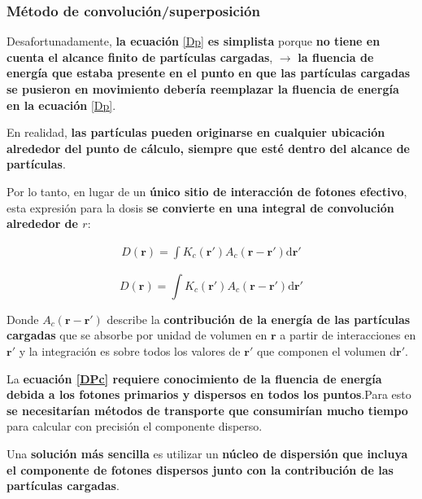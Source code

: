 \documentclass[aspectratio=169,xcolor=dvipsnames,t]{beamer}
\newcommand{\be}{\begin{equation*}}
\newcommand{\ee}{\end{equation*}}
\newcommand{\bae}{\begin{eqnarray}}
\newcommand{\eae}{\end{eqnarray}}
\begin{document}
\begin{frame}

    \frametitle{Método de convolución/superposición}

    Desafortunadamente, \textbf{la ecuación} \eqref{Dp} \textbf{es simplista} porque \textbf{no tiene en cuenta el alcance finito de partículas cargadas}, $\rightarrow$ \textbf{la fluencia de energía que estaba presente en el punto en que las partículas cargadas se pusieron en movimiento debería reemplazar la fluencia de energía en la ecuación} \eqref{Dp}.

    En realidad, \textbf{las partículas pueden originarse en cualquier ubicación alrededor del punto de cálculo, siempre que esté dentro del alcance de partículas}.

    Por lo tanto, en lugar de un \textbf{único sitio de interacción de fotones efectivo}, esta expresión para la dosis \textbf{se convierte en una integral de convolución alrededor de $r$}:

    \bae \label{DPc}
    D(\mathbf{r}) = \int K_c(\mathbf{r'}) A_c (\mathbf{r}-\mathbf{r'}) \text{d}\mathbf{r'}
    \eae
    
\end{frame}

\begin{frame}
    
    \vspace{0.5cm}

    \be
    D(\mathbf{r}) = \int K_c(\mathbf{r'}) A_c (\mathbf{r}-\mathbf{r'}) \text{d}\mathbf{r'}
    \ee

    Donde $A_c (\mathbf{r}-\mathbf{r'})$ describe la \textbf{contribución de la energía de las partículas cargadas} que se absorbe por unidad de volumen en $\mathbf{r}$ a partir de interacciones en $\mathbf{r'}$ y la integración es sobre todos los valores de $\mathbf{r'}$ que componen el volumen d$\mathbf{r'}$.

    La \textbf{ecuación \eqref{DPc} requiere conocimiento de la fluencia de energía debida a los fotones primarios y dispersos en todos los puntos}.Para esto \textbf{se necesitarían métodos de transporte que consumirían mucho tiempo} para calcular con precisión el componente disperso.

    Una \textbf{solución más sencilla} es utilizar un \textbf{núcleo de dispersión que incluya el componente de fotones dispersos junto con la contribución de las partículas cargadas}. 
    
\end{frame}
\end{document}
